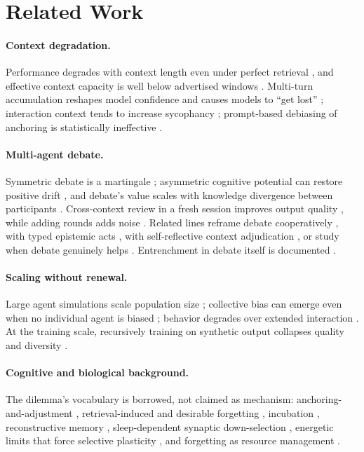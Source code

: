 \documentclass[12pt]{article}
\begin{document}
\section{Related Work}

\paragraph{Context degradation.} Performance degrades with context length even
under perfect retrieval \citep{du2025context,liu2023lost}, and effective context
capacity is well below advertised windows \citep{chroma2025contextrot,
scaling2026paradox}. Multi-turn accumulation reshapes model confidence
\citep{harshavardhan2026sacd} and causes models to ``get lost''
\citep{laban2025lost}; interaction context tends to increase sycophancy
\citep{jain2025sycophancy}; prompt-based debiasing of anchoring is
statistically ineffective \citep{feng2026anchoring}.

\paragraph{Multi-agent debate.} Symmetric debate is a martingale
\citep{choi2025debate}; asymmetric cognitive potential can restore positive
drift \citep{liu2026acemad}, and debate's value scales with knowledge divergence
between participants \citep{young2026divergence}. Cross-context review in a fresh
session improves output quality \citep{song2026ccr}, while adding rounds adds
noise \citep{song2026dccr}. Related lines reframe debate cooperatively
\citep{chen2025colmad}, with typed epistemic acts
\citep{debate2026deliberation}, with self-reflective context adjudication
\citep{srdcr2025}, or study when debate genuinely helps
\citep{wu2025debate,m2cl2026}. Entrenchment in debate itself is documented
\citep{oh2025dreamad}.

\paragraph{Scaling without renewal.} Large agent simulations scale population
size \citep{pang2025agentsociety}; collective bias can emerge even when no
individual agent is biased \citep{ashery2025conventions}; behavior degrades over
extended interaction \citep{rath2026agentdrift}. At the training scale,
recursively training on synthetic output collapses quality and diversity
\citep{shumailov2024collapse,alemohammad2024mad}.

\paragraph{Cognitive and biological background.} The dilemma's vocabulary is
borrowed, not claimed as mechanism: anchoring-and-adjustment
\citep{epley2006anchoring}, retrieval-induced and desirable forgetting
\citep{storm2012forgetting,slamecka1978generation,roediger2006test}, incubation
\citep{sio2009incubation}, reconstructive memory \citep{bartlett1932remembering},
sleep-dependent synaptic down-selection \citep{tononi2014plasticity}, energetic
limits that force selective plasticity
\citep{tyree2023competitive,li2024energyefficiency}, and forgetting as resource
management \citep{liu2024forgettingsurvey,xie2026sleepgate}.
\end{document}
